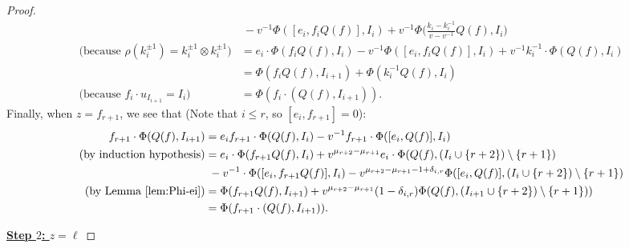 \documentclass{amsart}
\numberwithin{equation}{section}
\theoremstyle{theorem}
\theoremstyle{definition}
\newcommand{\sm}{\setminus}
\begin{document}
\begin{proof}
\begin{align*}
&~-v^{-1}\Phi([e_i,f_iQ(f)], I_{i})+v^{-1}\Phi\Big(\frac{k_i-k_i^{-1}}{v-v^{-1}}Q(f), I_{i}\Big)\\
\text{(because $\rho(k_i^{\pm 1})=k_i^{\pm 1}\otimes k_i^{\pm 1}$)}&=e_i\cdot \Phi(f_iQ(f),I_i)-v^{-1}\Phi([e_i,f_iQ(f)],I_i)+v^{-1}k_i^{-1}\cdot \Phi(Q(f),I_i)\\
&=\Phi(f_iQ(f),I_{i+1})+ \Phi(k_i^{-1}Q(f),I_i)\\
\text{(because $f_i\cdot u_{I_{i+1}}=I_i$) }&=\Phi(f_i\cdot (Q(f), I_{i+1})).
\end{align*}
Finally, when $z=f_{r+1}$, we see that (Note that $i\leq r$, so $[e_i,f_{r+1}]=0$):
\begin{align*}
f_{r+1}\cdot\Phi( Q(f),I_{i+1})&=e_if_{r+1}\cdot \Phi( Q(f), I_i)-v^{-1}f_{r+1}\cdot\Phi([e_i,Q(f)], I_{i})\\
\text{(by induction hypothesis)}&=e_i\cdot \Phi(f_{r+1}Q(f), I_i)+v^{\mu_{r+2}-\mu_{r+1}}e_i\cdot \Phi( Q(f), (I_i\cup\{r+2\})\sm\{r+1\})\\
&~-v^{-1}\cdot\Phi([e_i,f_{r+1}Q(f)], I_{i})-v^{\mu_{r+2}-\mu_{r+1}-1+\delta_{i,r}}\Phi([e_i,Q(f)], (I_i\cup\{r+2\})\sm\{r+1\})\\
\text{(by Lemma \ref{lem:Phi-ei})}&=\Phi(f_{r+1}Q(f),I_{i+1}) + v^{\mu_{r+2}-\mu_{r+1}} (1-\delta_{i,r})\Phi(Q(f), (I_{i+1}\cup\{r+2\})\sm\{r+1\}))\\
&=\Phi(f_{r+1}\cdot (Q(f), I_{i+1})).
\end{align*}

\underline{\textbf{Step $2$: $z=\ell$}}


\end{proof}
\end{document}
